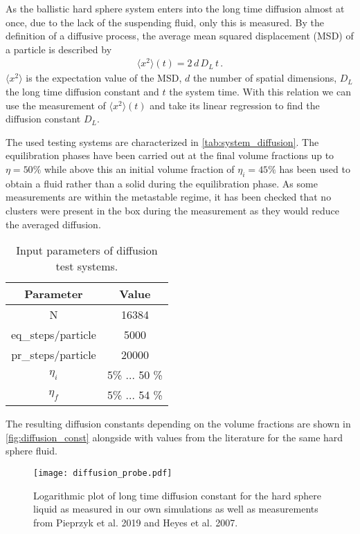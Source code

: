 As the ballistic hard sphere system enters into the long time diffusion almost at once, due to the lack of the suspending fluid, only this is measured. By the definition of a diffusive process, the average mean squared displacement (MSD) of a particle is described by 
\begin{align}
\label{eqn:diffusion}
\langle x^2 \rangle(t) = 2 \, d \, D_L \, t  \, \text{.}
\end{align}
$\langle x^2 \rangle$ is the expectation value of the MSD, $d$ the number of spatial dimensions, $D_L$ the long time diffusion constant and $t$ the system time. With this relation we can use the measurement of $\langle x^2 \rangle (t)$ and take its linear regression to find the diffusion constant $D_L$.

The used testing systems are characterized in \autoref{tab:system_diffusion}. The equilibration phases have been carried out at the final volume fractions up to $\eta = 50\%$ while above this an initial volume fraction of $\eta_i = 45\%$ has been used to obtain a fluid rather than a solid during the equilibration phase. As some measurements are within the metastable regime, it has been checked that no clusters were present in the box during the measurement as they would reduce the averaged diffusion.\\


\begin{table}[h]
\centering
\begin{tabular}{c|c}
Parameter & Value \\ \hline
N & 16384 \\
eq\_steps/particle & 5000 \\
pr\_steps/particle & 20000 \\
$\eta_i$ & 5\% ... 50 \% \\
$\eta_f$ & 5\% ... 54 \% \\
\end{tabular}
\caption[Simulation parameters for diffusion measurement]{Input parameters of diffusion test systems.}
\label{tab:system_diffusion}
\end{table}


The resulting diffusion constants depending on the volume fractions are shown in \autoref{fig:diffusion_const} alongside with values from the literature for the same hard sphere fluid.\\

\begin{figure}[h]
\centering
\texttt{[image: diffusion\_probe.pdf]}
\caption[Long time diffusion constant at varying volume fractions]{Logarithmic plot of long time diffusion constant for the hard sphere liquid as measured in our own simulations as well as measurements from Pieprzyk et al. 2019\cite{Pieprzyk2019} and Heyes et al. 2007\cite{Heyes2007}.}
\label{fig:diffusion_const}
\end{figure}

